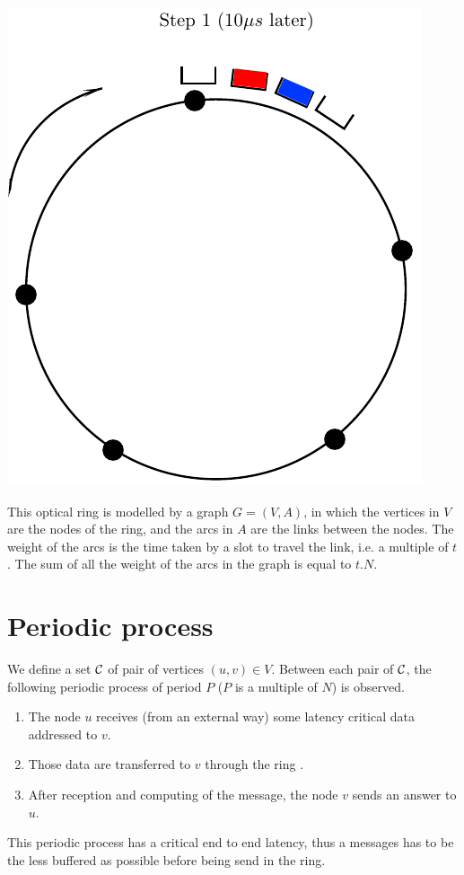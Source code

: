 \documentclass[a4paper,10pt]{article}
\begin{document}
\begin{center}
      \includegraphics[scale=0.5]{anneau2.pdf}
  
\end{center}
This optical ring is modelled by a graph $G=(V,A)$, in which the vertices in $V$ are the nodes of the ring, and the arcs in $A$ are the links between the nodes. The weight of the arcs is the time taken by a slot to travel the link, i.e. a multiple of $t$. The sum of all the weight of the arcs in the graph is equal to $t.N$.

\section*{Periodic process}
We define a set $\cal C$ of pair of vertices $(u,v) \in V$. Between each pair of $\cal C$, the following periodic process of period $P$ ($P$ is a multiple of $N$) is observed.
\begin{enumerate}
 \item The node $u$ receives (from an external way) some latency critical data addressed to $v$.
 \item Those data are transferred to $v$ through the ring .
 \item After reception and computing of the message, the node $v$ sends an answer to $u$.
\end{enumerate}
 This periodic process has a critical end to end latency, thus a messages has to be the less buffered as possible before being send in the ring.
 
\end{document}
